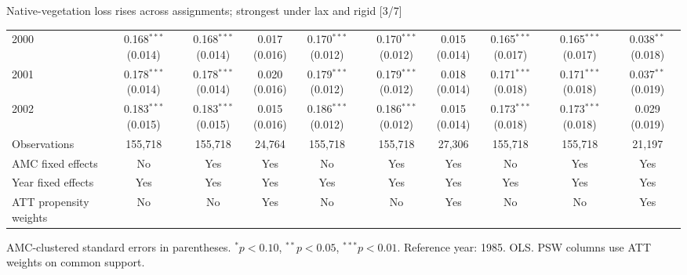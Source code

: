 \documentclass[aspectratio=169]{beamer}
\begin{document}
\begin{frame}{Native-vegetation loss rises across assignments; strongest under lax and rigid [3/7]}
{\begin{tabular}{@{}l*{9}{c}@{}}
2000 & \shortstack{0.168$^{***}$\\(0.014)} & \shortstack{0.168$^{***}$\\(0.014)} & \shortstack{0.017\\(0.016)} & \shortstack{0.170$^{***}$\\(0.012)} & \shortstack{0.170$^{***}$\\(0.012)} & \shortstack{0.015\\(0.014)} & \shortstack{0.165$^{***}$\\(0.017)} & \shortstack{0.165$^{***}$\\(0.017)} & \shortstack{0.038$^{**}$\\(0.018)} \\
2001 & \shortstack{0.178$^{***}$\\(0.014)} & \shortstack{0.178$^{***}$\\(0.014)} & \shortstack{0.020\\(0.016)} & \shortstack{0.179$^{***}$\\(0.012)} & \shortstack{0.179$^{***}$\\(0.012)} & \shortstack{0.018\\(0.014)} & \shortstack{0.171$^{***}$\\(0.018)} & \shortstack{0.171$^{***}$\\(0.018)} & \shortstack{0.037$^{**}$\\(0.019)} \\
2002 & \shortstack{0.183$^{***}$\\(0.015)} & \shortstack{0.183$^{***}$\\(0.015)} & \shortstack{0.015\\(0.016)} & \shortstack{0.186$^{***}$\\(0.012)} & \shortstack{0.186$^{***}$\\(0.012)} & \shortstack{0.015\\(0.014)} & \shortstack{0.173$^{***}$\\(0.018)} & \shortstack{0.173$^{***}$\\(0.018)} & \shortstack{0.029\\(0.019)} \\
\midrule
Observations & 155,718 & 155,718 & 24,764 & 155,718 & 155,718 & 27,306 & 155,718 & 155,718 & 21,197 \\
AMC fixed effects & No & Yes & Yes & No & Yes & Yes & No & Yes & Yes \\
Year fixed effects & Yes & Yes & Yes & Yes & Yes & Yes & Yes & Yes & Yes \\
ATT propensity weights & No & No & Yes & No & No & Yes & No & No & Yes \\
\bottomrule
\end{tabular}%
}
\vspace{0.1em}
{\tiny\color{ZMidGray} AMC-clustered standard errors in parentheses. $^{*}p<0.10$, $^{**}p<0.05$, $^{***}p<0.01$. Reference year: 1985. OLS. PSW columns use ATT weights on common support.}
\end{frame}
\end{document}
